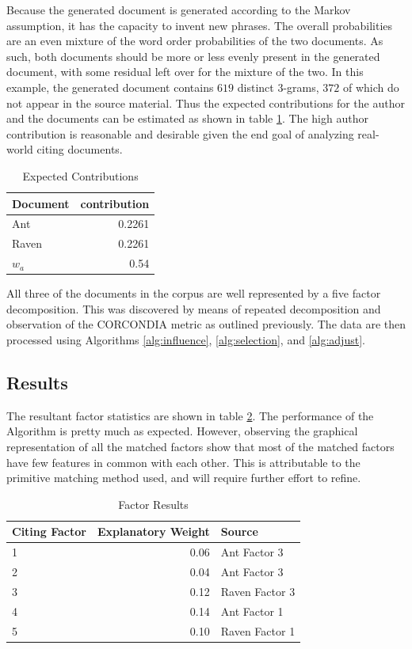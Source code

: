 \documentclass{article}
\begin{document}
Because the generated document is generated according to the Markov
assumption, it has the capacity to invent new phrases.  The overall
probabilities are an even mixture of the word order probabilities of
the two documents.  As such, both documents should be more or less
evenly present in the generated document, with some residual left over
for the mixture of the two.  In this example, the generated document
contains $619$ distinct 3-grams, $372$ of which do not appear in the
source material.  Thus the expected contributions for the author and
the documents can be estimated as shown in table \ref{tab:expected}. The
high author contribution is reasonable and desirable given the end
goal of analyzing real-world citing documents.

\begin{table}
    \begin{tabular}{l|r}
    {\bf Document} & {\bf contribution} \\
    \hline
    Ant &  0.2261 \\
    Raven & 0.2261 \\
    $w_a$ & 0.54 \\
    \end{tabular}
    \caption{Expected Contributions}
    \label{tab:expected}
\end{table}

All three of the documents in the corpus are well represented by
a five factor decomposition. This was discovered by means of repeated
decomposition and observation of the CORCONDIA metric as outlined
previously.  The data are then processed using Algorithms
\ref{alg:influence}, \ref{alg:selection}, and \ref{alg:adjust}.

\subsection{Results}
The resultant factor statistics are shown in table \ref{tab:results}.  The
performance of the Algorithm is pretty much as expected.  However,
observing the graphical representation of all the matched factors show
that most of the matched factors have few features in common with each
other.  This is attributable to the primitive matching method used,
and will require further effort to refine.

\begin{table}
    \begin{tabular}{l|r|l}
        {\bf Citing Factor} & {\bf Explanatory Weight} & {Source}\\
        \hline
        1 & 0.06 & Ant Factor 3\\
        2 & 0.04 & Ant Factor 3\\
        3 & 0.12 & Raven Factor 3\\
        4 & 0.14 & Ant Factor 1\\
        5 & 0.10 & Raven Factor 1\\
    \end{tabular}
    \caption{Factor Results}
    \label{tab:results}
\end{table}
\end{document}
